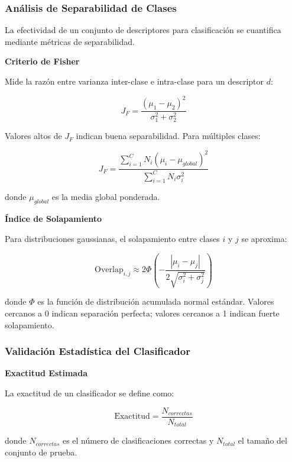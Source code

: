 \subsubsection{Análisis de Separabilidad de Clases}

La efectividad de un conjunto de descriptores para clasificación se cuantifica mediante métricas de separabilidad.

\textbf{Criterio de Fisher}

Mide la razón entre varianza inter-clase e intra-clase para un descriptor $d$:

\begin{equation}
J_F = \frac{(\mu_1 - \mu_2)^2}{\sigma_1^2 + \sigma_2^2}
\end{equation}

Valores altos de $J_F$ indican buena separabilidad. Para múltiples clases:

\begin{equation}
J_F = \frac{\sum_{i=1}^{C} N_i(\mu_i - \mu_{global})^2}{\sum_{i=1}^{C} N_i \sigma_i^2}
\end{equation}

donde $\mu_{global}$ es la media global ponderada.

\textbf{Índice de Solapamiento}

Para distribuciones gaussianas, el solapamiento entre clases $i$ y $j$ se aproxima:

\begin{equation}
\text{Overlap}_{i,j} \approx 2\Phi\left(-\frac{|\mu_i - \mu_j|}{2\sqrt{\sigma_i^2 + \sigma_j^2}}\right)
\end{equation}

donde $\Phi$ es la función de distribución acumulada normal estándar. Valores cercanos a 0 indican separación perfecta; valores cercanos a 1 indican fuerte solapamiento.

\subsubsection{Validación Estadística del Clasificador}

\textbf{Exactitud Estimada}

La exactitud de un clasificador se define como:

\begin{equation}
\text{Exactitud} = \frac{N_{correctas}}{N_{total}}
\end{equation}

donde $N_{correctas}$ es el número de clasificaciones correctas y $N_{total}$ el tamaño del conjunto de prueba.

